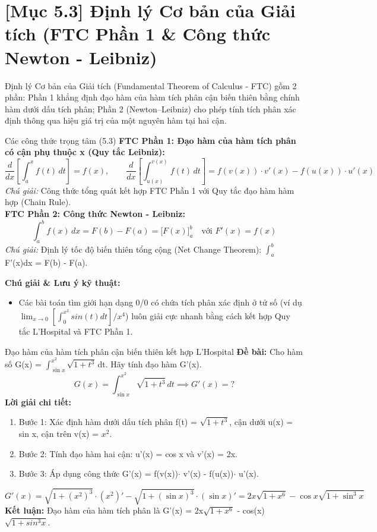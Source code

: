 \documentclass[11pt,a4paper,oneside]{book}
\begin{document}
\section{[Mục 5.3] Định lý Cơ bản của Giải tích (FTC Phần 1 \& Công thức Newton - Leibniz)}
Định lý Cơ bản của Giải tích (Fundamental Theorem of Calculus - FTC) gồm 2 phần: Phần 1 khẳng định đạo hàm của hàm tích phân cận biến thiên bằng chính hàm dưới dấu tích phân; Phần 2 (Newton–Leibniz) cho phép tính tích phân xác định thông qua hiệu giá trị của một nguyên hàm tại hai cận.

\begin{congthuc}{Các công thức trọng tâm (5.3)}
\noindent\textbf{FTC Phần 1: Đạo hàm của hàm tích phân có cận phụ thuộc x (Quy tắc Leibniz):}
\[ \frac{d}{dx} \left[ \int_a^x f(t)\,dt \right] = f(x), \qquad \frac{d}{dx} \left[ \int_{u(x)}^{v(x)} f(t)\,dt \right] = f(v(x))\cdot v'(x) - f(u(x))\cdot u'(x) \]
\noindent\textit{Chú giải:} Công thức tổng quát kết hợp FTC Phần 1 với Quy tắc đạo hàm hàm hợp (Chain Rule).\\[4pt]
\noindent\textbf{FTC Phần 2: Công thức Newton - Leibniz:}
\[ \int_a^b f(x)\,dx = F(b) - F(a) = \Big[F(x)\Big]_a^b \quad \text{với } F'(x) = f(x) \]
\noindent\textit{Chú giải:} Định lý tốc độ biến thiên tổng cộng (Net Change Theorem): $\int_a^b$ F'(x)dx = F(b) - F(a).\\[4pt]
\end{congthuc}

\noindent\textbf{Chú giải \& Lưu ý kỹ thuật:}
\begin{itemize}[leftmargin=1.5em, itemsep=2pt]
  \item Các bài toán tìm giới hạn dạng 0/0 có chứa tích phân xác định ở tử số (ví dụ $\lim_{x\to 0} [\int_0^{x^2} sin(t)dt] / x^4$) luôn giải cực nhanh bằng cách kết hợp Quy tắc L'Hospital và FTC Phần 1.
\end{itemize}

\begin{vidu}{Đạo hàm của hàm tích phân cận biến thiên kết hợp L'Hospital}
\textbf{Đề bài:} Cho hàm số G(x) = $\int_{\sin x}^{x^2} \sqrt{1 + t^3}$\,dt. Hãy tính đạo hàm G'(x).
\[ G(x) = \int_{\sin x}^{x^2} \sqrt{1 + t^3}\,dt \implies G'(x) = ? \]
\textbf{Lời giải chi tiết:}
\begin{enumerate}[leftmargin=1.5em, itemsep=2pt]
  \item Bước 1: Xác định hàm dưới dấu tích phân f(t) = $\sqrt{1 + t^3}$, cận dưới u(x) = sin x, cận trên v(x) = $x^2$.
  \item Bước 2: Tính đạo hàm hai cận: u'(x) = cos x và v'(x) = 2x.
  \item Bước 3: Áp dụng công thức G'(x) = f(v(x))$\cdot$ v'(x) - f(u(x))$\cdot$ u'(x).
\end{enumerate}
\[ G'(x) = \sqrt{1 + (x^2)^3} \cdot (x^2)' - \sqrt{1 + (\sin x)^3} \cdot (\sin x)' = 2x\sqrt{1 + x^6} - \cos x \sqrt{1 + \sin^3 x} \]
\noindent\textbf{Kết luận:} Đạo hàm của hàm tích phân là G'(x) = 2x$\sqrt{1 + x^6}$ - cos(x)$\sqrt{1 + sin^3 x}$.
\end{vidu}
\end{document}
